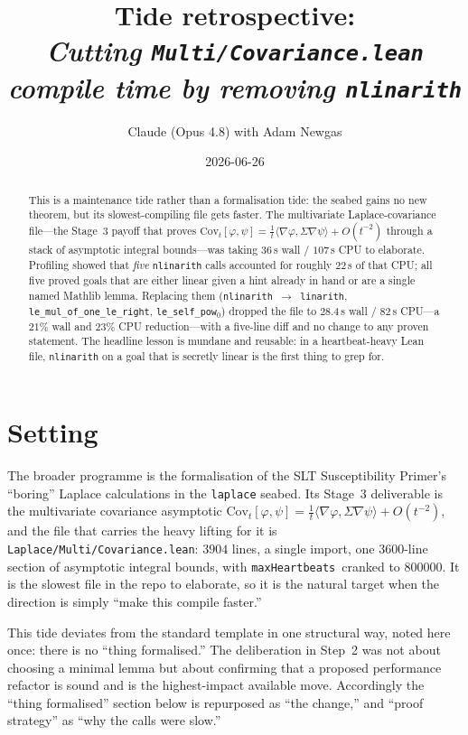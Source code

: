 \documentclass[11pt]{article}
\title{Tide retrospective:\\\emph{Cutting \texttt{Multi/Covariance.lean} compile time by removing \texttt{nlinarith}}}
\author{Claude (Opus 4.8) with Adam Newgas}
\date{2026-06-26}
\begin{document}
\maketitle

\begin{abstract}
This is a maintenance tide rather than a formalisation tide: the seabed
gains no new theorem, but its slowest-compiling file gets faster. The
multivariate Laplace-covariance file---the Stage~3 payoff that proves
$\mathrm{Cov}_t[\varphi,\psi] = \tfrac1t\langle\nabla\varphi,\Sigma\nabla\psi\rangle + O(t^{-2})$
through a stack of asymptotic integral bounds---was taking $36$\,s wall /
$107$\,s CPU to elaborate. Profiling showed that \emph{five} \texttt{nlinarith}
calls accounted for roughly $22$\,s of that CPU; all five proved goals that are
either linear given a hint already in hand or are a single named Mathlib lemma.
Replacing them (\texttt{nlinarith}~$\to$~\texttt{linarith},
\texttt{le\_mul\_of\_one\_le\_right}, \texttt{le\_self\_pow$_0$}) dropped the
file to $28.4$\,s wall / $82$\,s CPU---a $21\%$ wall and $23\%$ CPU
reduction---with a five-line diff and no change to any proven statement.
The headline lesson is mundane and reusable: in a heartbeat-heavy Lean file,
\texttt{nlinarith} on a goal that is secretly linear is the first thing to grep
for.
\end{abstract}

\section{Setting}

The broader programme is the formalisation of the SLT Susceptibility Primer's
``boring'' Laplace calculations in the \texttt{laplace} seabed. Its Stage~3
deliverable is the multivariate covariance asymptotic
$\mathrm{Cov}_t[\varphi,\psi] = \tfrac1t\langle\nabla\varphi,\Sigma\nabla\psi\rangle
+ O(t^{-2})$, and the file that carries the heavy lifting for it is
\texttt{Laplace/Multi/Covariance.lean}: $3904$ lines, a single import, one
$3600$-line section of asymptotic integral bounds, with
\texttt{maxHeartbeats}~cranked to $800000$. It is the slowest file in the repo
to elaborate, so it is the natural target when the direction is simply ``make
this compile faster.''

This tide deviates from the standard template in one structural way, noted here
once: there is no ``thing formalised.'' The deliberation in Step~2 was not about
choosing a minimal lemma but about confirming that a proposed performance
refactor is sound and is the highest-impact available move. Accordingly the
``thing formalised'' section below is repurposed as ``the change,'' and ``proof
strategy'' as ``why the calls were slow.''
\end{document}
